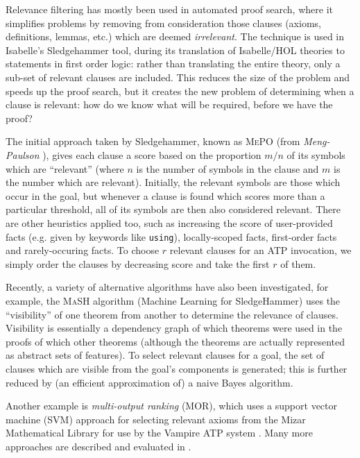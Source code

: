 Relevance filtering has mostly been used in automated proof search, where it simplifies problems by removing from consideration those clauses (axioms, definitions, lemmas, etc.) which are deemed \emph{irrelevant}. The technique is used in Isabelle's Sledgehammer tool, during its translation of Isabelle/HOL theories to statements in first order logic: rather than translating the entire theory, only a sub-set of relevant clauses are included. This reduces the size of the problem and speeds up the proof search, but it creates the new problem of determining when a clause is relevant: how do we know what will be required, before we have the proof?

The initial approach taken by Sledgehammer, known as \textsc{MePO} \iffalse TODO: Check name \fi (from \emph{Meng-Paulson} \citep{meng2009lightweight}), gives each clause a score based on the proportion $m / n$ of its symbols which are ``relevant'' (where $n$ is the number of symbols in the clause and $m$ is the number which are relevant). Initially, the relevant symbols are those which occur in the goal, but whenever a clause is found which scores more than a particular threshold, all of its symbols are then also considered relevant. There are other heuristics applied too, such as increasing the score of user-provided facts (e.g. given by keywords like \texttt{using}), locally-scoped facts, first-order facts and rarely-occuring facts. To choose $r$ relevant clauses for an ATP invocation, we simply order the clauses by decreasing score and take the first $r$ of them.

Recently, a variety of alternative algorithms have also been investigated, for example, the \textsc{MaSH} algorithm (Machine Learning for SledgeHammer) \citep{kuhlwein2013mash} uses the ``visibility'' of one theorem from another to determine the relevance of clauses. Visibility is essentially a dependency graph of which theorems were used in the proofs of which other theorems (although the theorems are actually represented as abstract sets of features). To select relevant clauses for a goal, the set of clauses which are visible from the goal's components is generated; this is further reduced by (an efficient approximation of) a naive Bayes algorithm.

Another example is \emph{multi-output ranking} (MOR), which uses a support vector machine (SVM) approach for selecting relevant axioms from the Mizar Mathematical Library for use by the Vampire ATP system \citep{alama2014premise}. Many more approaches are described and evaluated in \citep{kuhlwein2012overview}.


